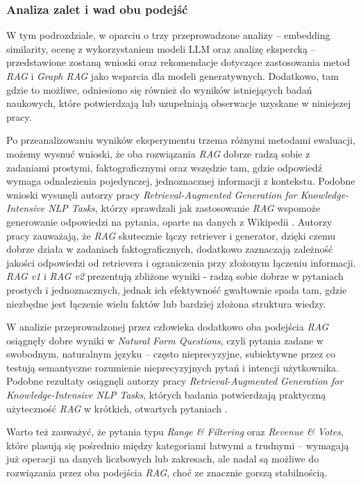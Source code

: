 \documentclass[
a4paper,
12pt,
]{article}
\begin{document}
\subsubsection{Analiza zalet i wad obu podejść}

W tym podrozdziale, w oparciu o trzy przeprowadzone analizy -- embedding similarity, ocenę z wykorzystaniem modeli LLM oraz analizę ekspercką -- przedstawione zostaną wnioski oraz rekomendacje dotyczące zastosowania metod \textit{RAG} i \textit{Graph RAG} jako wsparcia dla modeli generatywnych. Dodatkowo, tam gdzie to możliwe, odniesiono się również do wyników istniejących badań naukowych, które potwierdzają lub uzupełniają obserwacje uzyskane w niniejszej pracy.

Po przeanalizowaniu wyników eksperymentu trzema różnymi metodami ewaluacji, możemy wysnuć wnioski, że oba rozwiązania \textit{RAG} dobrze radzą sobie z zadaniami prostymi, faktograficznymi oraz wszędzie tam, gdzie odpowiedź wymaga odnalezienia pojedynczej, jednoznacznej informacji z kontekstu.  Podobne wnioski wysunęli autorzy pracy \textit{Retrieval-Augmented Generation for Knowledge-Intensive NLP Tasks}, którzy sprawdzali jak zastosowanie \textit{RAG} wspomoże generowanie odpowiedzi na pytania, oparte na danych z Wikipedii \cite{NEURIPS2020_6b493230}. Autorzy pracy zauważają, że \textit{RAG} skutecznie łączy retriever i generator, dzięki czemu dobrze działa w zadaniach faktograficznych, dodatkowo zaznaczają zależność jakości odpowiedzi od retrievera i ograniczenia przy złożonym łączeniu informacji. \textit{RAG v1} i \textit{RAG v2} prezentują zbliżone wyniki - radzą sobie dobrze w pytaniach prostych i jednoznacznych, jednak ich efektywność gwałtownie spada tam, gdzie niezbędne jest łączenie wielu faktów lub bardziej złożona struktura wiedzy.

W analizie przeprowadzonej przez człowieka dodatkowo oba podejścia \textit{RAG} osiągnęły dobre wyniki w \textit{Natural Form Questions}, czyli pytania zadane w swobodnym, naturalnym języku -- często nieprecyzyjne, subiektywne przez co testują semantyczne rozumienie nieprecyzyjnych pytań i intencji użytkownika. Podobne rezultaty osiągnęli autorzy pracy \textit{Retrieval-Augmented Generation for Knowledge-Intensive NLP Tasks}, których badania potwierdzają praktyczną użyteczność \textit{RAG} w krótkich, otwartych pytaniach \cite{NEURIPS2020_6b493230}. 

Warto też zauważyć, że pytania typu \textit{Range \& Filtering} oraz \textit{Revenue \& Votes}, które plasują się pośrednio między kategoriami łatwymi a trudnymi -- wymagają już operacji na danych liczbowych lub zakresach, ale nadal są możliwe do rozwiązania przez oba podejścia \textit{RAG}, choć ze znacznie gorszą stabilnością.
\end{document}
